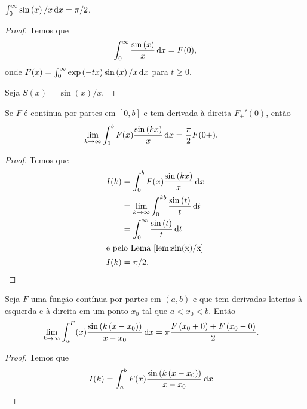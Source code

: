 \begin{lem} \label{lem:sin(x)/x}
    $\int_0^\infty \sin\left( x \right) / x \, \mathrm{d}x = \pi / 2$.
\end{lem}
\begin{proof}
    Temos que
    \begin{align*}
        \int_0^\infty \frac{\sin\left( x \right)}{x} \, \mathrm{d}x = F(0),
    \end{align*}
    onde $F(x) = \int_0^\infty \exp\left( -t x \right) \sin\left( x \right) / x \, \mathrm{d}x$ para $t \geq 0$.

    Seja $S(x) = \sin\left( x \right) / x$.
\end{proof}

\begin{lem} \label{lem:F_+'(x)}
    Se $F$ \'{e} cont\'{i}nua por partes em $[0,b]$ e tem derivada \`{a} direita $F_+'(0)$, ent\~{a}o
    \begin{align*}
        \lim_{k \to \infty} \int_0^b F(x) \frac{\sin\left( k x \right)}{x} \, \mathrm{d}x &= \frac{\pi}{2} F(0+).
    \end{align*}
\end{lem}
\begin{proof}
    Temos que
    \begin{align*}
        I(k) &= \int_0^b F(x) \frac{\sin\left( k x \right)}{x} \, \mathrm{d}x \\
        &= \lim_{k \to \infty} \int_0^{k b} \frac{\sin\left( t \right)}{t} \, \mathrm{d}t \\
        &= \int_0^\infty \frac{\sin\left( t \right)}{t} \, \mathrm{d}t \\
        \intertext{e pelo Lema~\ref{lem:sin(x)/x}}
        I(k) &= \pi / 2.
    \end{align*}
\end{proof}

\begin{lem}
    Seja $F$ uma fun\c{c}\~{a}o cont\'{i}nua por partes em $(a,b)$ e que tem derivadas laterias \`{a} esquerda e \`{a} direita em um ponto $x_0$ tal que $a < x_0 < b$. Ent\~{a}o
    \begin{align*}
        \lim_{k \to \infty} \int_a^ F(x) \frac{\sin\left( k \left( x - x_0 \right) \right)}{x - x_0} \, \mathrm{d}x &= \pi \frac{F\left( x_0 + 0 \right) + F\left( x_0 - 0 \right)}{2}.
    \end{align*}
\end{lem}
\begin{proof}
    Temos que
    \begin{align*}
        I(k) &= \int_a^b F(x) \frac{\sin\left( k \left( x - x_0 \right) \right)}{x - x_0} \, \mathrm{d}x
    \end{align*}
\end{proof}

